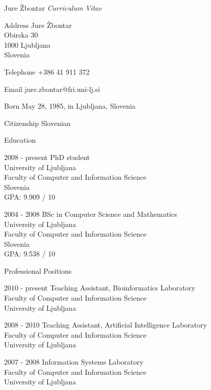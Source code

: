 \documentclass[12pt,a4paper]{article}
\begin{document}
\begin{cv}{Jure Žbontar}
\noindent \emph{Curriculum Vitae}

\begin{cvlist}{}
\item[Address] Jure Žbontar \\
Obirska 30 \\
1000 Ljubljana \\
Slovenia

\item[Telephone] +386 41 911 372 
\item[Email] jure.zbontar@fri.uni-lj.si

\item[Born] May 28, 1985, in Ljubljana, Slovenia
\item[Citizenship] Slovenian

\end{cvlist}

\begin{cvlist}{Education}
\item[2008 - present] PhD student \\
University of Ljubljana \\
Faculty of Computer and Information Science \\
Slovenia \\
GPA: 9.909 / 10

\item[2004 - 2008] BSc in Computer Science and Mathematics \\
University of Ljubljana \\
Faculty of Computer and Information Science \\
Slovenia \\
GPA: 9.538 / 10

\end{cvlist}


\begin{cvlist}{Professional Positions}
\item[2010 - present] Teaching Assistant, Bioinformatics Laboratory  \\
Faculty of Computer and Information Science \\
University of Ljubljana

\item[2008 - 2010] Teaching Assistant, Artificial Intelligence Laboratory \\
Faculty of Computer and Information Science \\
University of Ljubljana

\item[2007 - 2008] Information Systems Laboratory \\
Faculty of Computer and Information Science \\
University of Ljubljana


\end{cvlist}
\end{cv}
\end{document}
